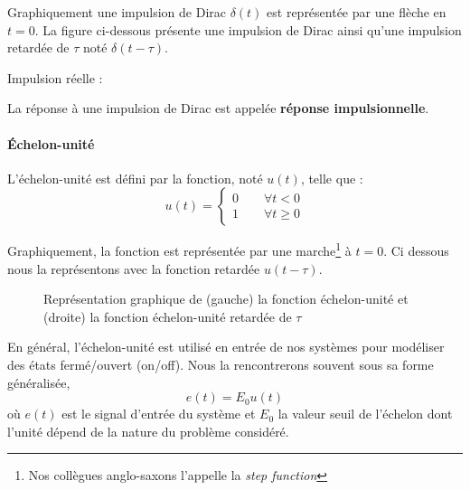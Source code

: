 Graphiquement une impulsion de Dirac $\delta(t)$ est 
représentée par une flèche en $t=0$. La figure ci-dessous présente 
une impulsion de Dirac ainsi qu'une 
impulsion retardée de $\tau$ noté $\delta(t-\tau)$.

\begin{figure}[!h]
\begin{center}

\end{center}
\caption{\label{fig-dirac}}
\end{figure}

Impulsion réelle :

\begin{figure}[!h]
\begin{center}

    \caption{\label{fig-dirac2}}
\end{center}
\end{figure}

La réponse à une impulsion de Dirac est appelée \textbf{réponse impulsionnelle}.

\paragraph{\'Echelon-unité}

L'échelon-unité est défini par la fonction, noté $u(t)$, telle que :
$$
u(t)=
\begin{cases} 
0 \qquad \forall t<0    \\ 
1 \qquad \forall t\geq 0 
\end{cases}
$$

Graphiquement, la fonction est représentée par une marche\footnote{Nos 
collègues anglo-saxons l'appelle la \og\emph{step function}\fg} à $t=0$. 
Ci dessous nous la représentons avec la fonction retardée $u(t-\tau)$.
\begin{figure}[!h]
\begin{center}

\end{center}
    \caption{Représentation graphique de (gauche) la fonction échelon-unité et (droite) la fonction 
    échelon-unité retardée de $\tau$\label{fig-echelon}}
\end{figure}

En général, l'échelon-unité est utilisé en entrée de nos systèmes pour 
modéliser des états fermé/ouvert (\og on/off\fg).
Nous la rencontrerons souvent sous sa forme généralisée, 
$$
e(t)=E_0u(t)
$$
où $e(t)$ est le signal d'entrée du système et $E_0$ la valeur seuil de l'échelon dont 
l'unité dépend de la nature du problème considéré.

